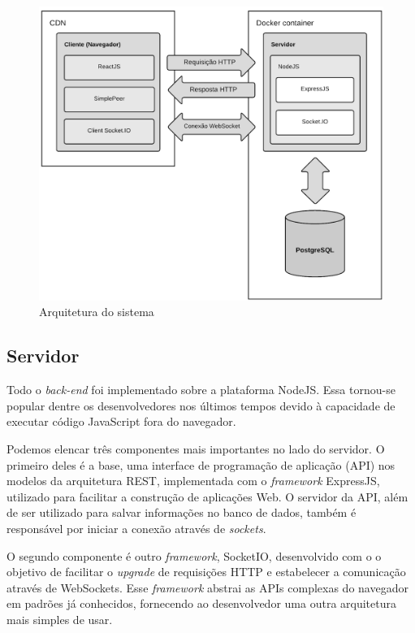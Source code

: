\begin{figure}[ht!]
	\centering
		\includegraphics[scale=0.2]{figures/overview-architecture.png} 
	\caption{Arquitetura do sistema}
	\label{fig:overview_architecture}
\end{figure}

\subsection{Servidor}

Todo o \textit{back-end} foi implementado sobre a plataforma NodeJS. Essa tornou-se popular dentre os desenvolvedores nos últimos tempos devido à capacidade de executar código JavaScript fora do navegador. 

Podemos elencar três componentes mais importantes no lado do servidor. O primeiro deles é a base, uma interface de programação de aplicação (API) nos modelos da arquitetura REST, implementada com o \textit{framework} ExpressJS, utilizado para facilitar a construção de aplicações Web. O servidor da API, além de ser utilizado para salvar informações no banco de dados, também é responsável por iniciar a conexão através de \textit{sockets}.

O segundo componente é outro \textit{framework}, SocketIO, desenvolvido com o o objetivo de facilitar o \textit{upgrade} de requisições HTTP e estabelecer a comunicação através de WebSockets. Esse \textit{framework} abstrai as APIs complexas do navegador em padrões já conhecidos, fornecendo ao desenvolvedor uma outra arquitetura mais simples de usar.

